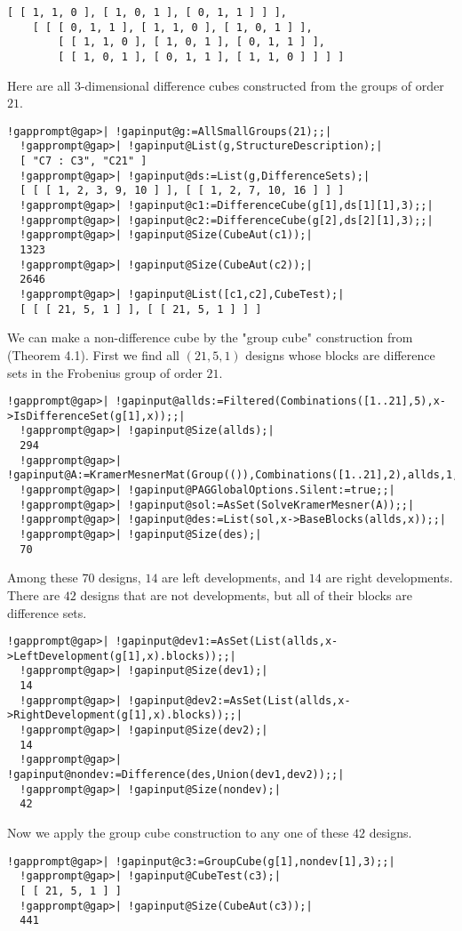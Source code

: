 \documentclass[a4paper,11pt]{report}
\begin{document}
{{\begin{Verbatim}[commandchars=!@|,fontsize=\small,frame=single,label=Example]
        [ [ 1, 1, 0 ], [ 1, 0, 1 ], [ 0, 1, 1 ] ] ], 
    [ [ [ 0, 1, 1 ], [ 1, 1, 0 ], [ 1, 0, 1 ] ], 
        [ [ 1, 1, 0 ], [ 1, 0, 1 ], [ 0, 1, 1 ] ], 
        [ [ 1, 0, 1 ], [ 0, 1, 1 ], [ 1, 1, 0 ] ] ] ]
\end{Verbatim}
 Here are all $3$-dimensional difference cubes constructed from the groups of order $21$. 
\begin{Verbatim}[commandchars=!@|,fontsize=\small,frame=single,label=Example]
  !gapprompt@gap>| !gapinput@g:=AllSmallGroups(21);;|
  !gapprompt@gap>| !gapinput@List(g,StructureDescription);|
  [ "C7 : C3", "C21" ]
  !gapprompt@gap>| !gapinput@ds:=List(g,DifferenceSets);|
  [ [ [ 1, 2, 3, 9, 10 ] ], [ [ 1, 2, 7, 10, 16 ] ] ]
  !gapprompt@gap>| !gapinput@c1:=DifferenceCube(g[1],ds[1][1],3);;|
  !gapprompt@gap>| !gapinput@c2:=DifferenceCube(g[2],ds[2][1],3);;|
  !gapprompt@gap>| !gapinput@Size(CubeAut(c1));|
  1323
  !gapprompt@gap>| !gapinput@Size(CubeAut(c2));|
  2646
  !gapprompt@gap>| !gapinput@List([c1,c2],CubeTest);|
  [ [ [ 21, 5, 1 ] ], [ [ 21, 5, 1 ] ] ]
\end{Verbatim}
 We can make a non-difference cube by the "group cube" construction from \cite{KPT23} (Theorem 4.1). First we find all $(21,5,1)$ designs whose blocks are difference sets in the Frobenius group of order $21$. 
\begin{Verbatim}[commandchars=!@|,fontsize=\small,frame=single,label=Example]
  !gapprompt@gap>| !gapinput@allds:=Filtered(Combinations([1..21],5),x->IsDifferenceSet(g[1],x));;|
  !gapprompt@gap>| !gapinput@Size(allds);|
  294
  !gapprompt@gap>| !gapinput@A:=KramerMesnerMat(Group(()),Combinations([1..21],2),allds,1,21);;|
  !gapprompt@gap>| !gapinput@PAGGlobalOptions.Silent:=true;;|
  !gapprompt@gap>| !gapinput@sol:=AsSet(SolveKramerMesner(A));;|
  !gapprompt@gap>| !gapinput@des:=List(sol,x->BaseBlocks(allds,x));;|
  !gapprompt@gap>| !gapinput@Size(des);|
  70
\end{Verbatim}
 Among these $70$ designs, $14$ are left developments, and $14$ are right developments. There are $42$ designs that are not developments, but all of their blocks are difference
sets. 
\begin{Verbatim}[commandchars=!@|,fontsize=\small,frame=single,label=Example]
  !gapprompt@gap>| !gapinput@dev1:=AsSet(List(allds,x->LeftDevelopment(g[1],x).blocks));;|
  !gapprompt@gap>| !gapinput@Size(dev1);|
  14
  !gapprompt@gap>| !gapinput@dev2:=AsSet(List(allds,x->RightDevelopment(g[1],x).blocks));;|
  !gapprompt@gap>| !gapinput@Size(dev2);|
  14
  !gapprompt@gap>| !gapinput@nondev:=Difference(des,Union(dev1,dev2));;|
  !gapprompt@gap>| !gapinput@Size(nondev);|
  42
\end{Verbatim}
 Now we apply the group cube construction to any one of these $42$ designs. 
\begin{Verbatim}[commandchars=!@|,fontsize=\small,frame=single,label=Example]
  !gapprompt@gap>| !gapinput@c3:=GroupCube(g[1],nondev[1],3);;|
  !gapprompt@gap>| !gapinput@CubeTest(c3);|
  [ [ 21, 5, 1 ] ]
  !gapprompt@gap>| !gapinput@Size(CubeAut(c3));|
  441
\end{Verbatim}
 }

 }
\end{document}
